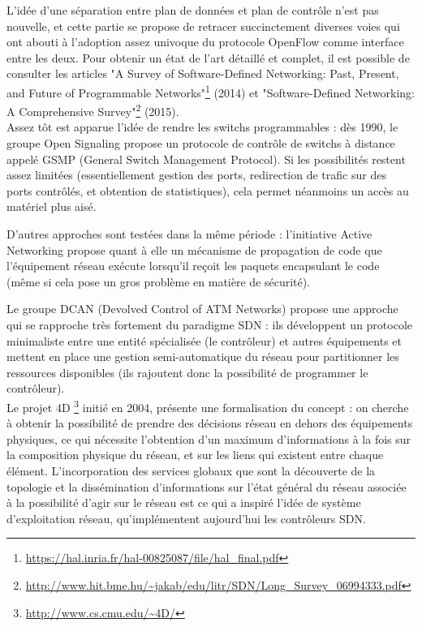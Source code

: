 L'idée d'une séparation entre plan de données et plan de contrôle n'est pas nouvelle, et cette partie se propose de retracer succinctement diverses voies qui ont abouti à l'adoption assez univoque du protocole OpenFlow comme interface entre les deux. Pour obtenir un état de l'art détaillé et complet, il est possible de consulter les articles "A Survey of Software-Defined Networking: Past, Present, and Future of Programmable Networks"\footnote{\label{histoire}\url{https://hal.inria.fr/hal-00825087/file/hal_final.pdf}} (2014) et "Software-Defined Networking: A Comprehensive Survey"\footnote{\url{http://www.hit.bme.hu/~jakab/edu/litr/SDN/Long_Survey_06994333.pdf}} (2015).\\

Assez tôt est apparue l'idée de rendre les switchs programmables : dès 1990, le groupe Open Signaling propose un protocole de contrôle de switchs à distance appelé GSMP (General Switch
Management  Protocol). Si les possibilités restent assez limitées (essentiellement gestion des ports, redirection de trafic sur des ports contrôlés, et obtention de statistiques), cela permet néanmoins un accès au matériel plus aisé.

D'autres approches sont testées dans la même période : l'initiative Active Networking propose quant à elle un mécanisme de propagation de code que l'équipement réseau exécute lorsqu'il reçoit les paquets encapsulant le code (même si cela pose un gros problème en matière de sécurité).

Le groupe DCAN (Devolved Control of ATM Networks) propose une approche qui se rapproche très fortement du paradigme SDN : ils développent un protocole minimaliste entre une entité spécialisée (le contrôleur) et autres équipements et mettent en place une gestion semi-automatique du réseau pour partitionner les ressources disponibles (ils rajoutent donc la possibilité de programmer le contrôleur).\\

Le projet 4D \footnote{\url{http://www.cs.cmu.edu/~4D/}} initié en 2004, présente une formalisation du concept : on cherche à obtenir la possibilité de prendre des décisions réseau en dehors des équipements physiques, ce qui nécessite l'obtention d'un maximum d'informations à la fois sur la composition physique du réseau, et sur les liens qui existent entre chaque élément. L'incorporation des services globaux que sont la découverte de la topologie et la dissémination d'informations sur l'état général du réseau associée à la possibilité d'agir sur le réseau est ce qui a inspiré l'idée de système d'exploitation réseau, qu'implémentent aujourd'hui les contrôleurs SDN.\\

